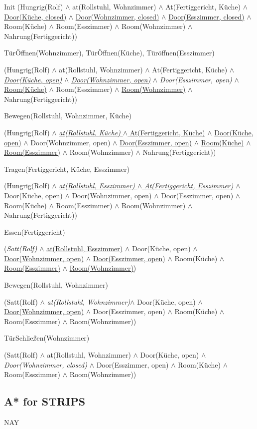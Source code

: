 \documentclass{../Vorlage/mat}
\begin{document}
Init (Hungrig(Rolf) $\wedge$ at(Rollstuhl, Wohnzimmer) $\wedge$ At(Fertiggericht, Küche) $\wedge$ \underline{Door(Küche, closed)} $\wedge$ \underline{Door(Wohnzimmer, closed)} $\wedge$ \underline{Door(Esszimmer, closed)} $\wedge$ Room(Küche) $\wedge$ Room(Esszimmer) $\wedge$ Room(Wohnzimmer) $\wedge$ Nahrung(Fertiggericht))

TürÖffnen(Wohnzimmer), TürÖffnen(Küche), Türöffnen(Esszimmer)

(Hungrig(Rolf) $\wedge$ at(Rollstuhl, Wohnzimmer) $\wedge$ At(Fertiggericht, Küche) $\wedge$ \textit{\underline{Door(Küche, open)}} $\wedge$ \textit{\underline{Door(Wohnzimmer, open)}} $\wedge$ \textit{Door(Esszimmer, open)} $\wedge$ \underline{Room(Küche)} $\wedge$ Room(Esszimmer) $\wedge$ \underline{Room(Wohnzimmer)} $\wedge$ Nahrung(Fertiggericht))

Bewegen(Rollstuhl, Wohnzimmer, Küche)

(Hungrig(Rolf) $\wedge$ \underline{\textit{at(Rollstuhl, Küche)} $\wedge$ At(Fertiggericht, Küche)} $\wedge$ \underline{Door(Küche, open)} $\wedge$ Door(Wohnzimmer, open) $\wedge$ \underline{Door(Esszimmer, open)} $\wedge$ \underline{Room(Küche)} $\wedge$ \underline{Room(Esszimmer)} $\wedge$ Room(Wohnzimmer) $\wedge$ Nahrung(Fertiggericht))

Tragen(Fertiggericht, Küche, Esszimmer)

(Hungrig(Rolf) $\wedge$ \underline{\textit{at(Rollstuhl, Esszimmer) $\wedge$ At(Fertiggericht, Esszimmer)}} $\wedge$ Door(Küche, open) $\wedge$ Door(Wohnzimmer, open) $\wedge$ Door(Esszimmer, open) $\wedge$ Room(Küche) $\wedge$ Room(Esszimmer) $\wedge$ Room(Wohnzimmer) $\wedge$ Nahrung(Fertiggericht))

Essen(Fertiggericht)

(\textit{Satt(Rolf)} $\wedge$ \underline{at(Rollstuhl, Esszimmer)} $\wedge$ Door(Küche, open) $\wedge$ \underline{Door(Wohnzimmer, open)} $\wedge$ \underline{Door(Esszimmer, open)} $\wedge$ Room(Küche) $\wedge$ \underline{Room(Esszimmer)} $\wedge$ \underline{Room(Wohnzimmer)})

Bewegen(Rollstuhl, Wohnzimmer)

(Satt(Rolf) $\wedge$ \textit{at(Rollstuhl, Wohnzimmer)}$\wedge$ Door(Küche, open) $\wedge$ \underline{Door(Wohnzimmer, open)} $\wedge$ Door(Esszimmer, open) $\wedge$ Room(Küche) $\wedge$ Room(Esszimmer) $\wedge$ Room(Wohnzimmer))

TürSchließen(Wohnzimmer)

(Satt(Rolf) $\wedge$ at(Rollstuhl, Wohnzimmer) $\wedge$ Door(Küche, open) $\wedge$ \textit{Door(Wohnzimmer, closed)} $\wedge$ Door(Esszimmer, open) $\wedge$ Room(Küche) $\wedge$ Room(Esszimmer) $\wedge$ Room(Wohnzimmer))


\subsection*{A* for STRIPS}
NAY
\end{document}
